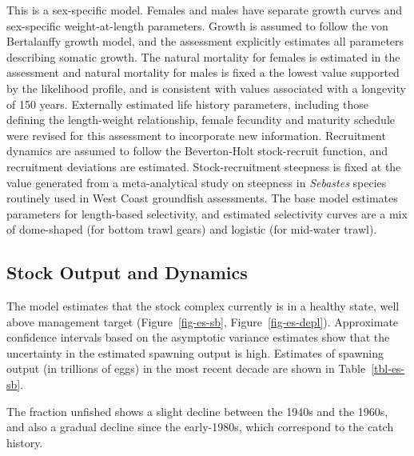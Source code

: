 \documentclass[
]{article}
\begin{document}
This is a sex-specific model. Females and males have separate growth
curves and sex-specific weight-at-length parameters. Growth is assumed
to follow the von Bertalanffy growth model, and the assessment
explicitly estimates all parameters describing somatic growth. The
natural mortality for females is estimated in the assessment and natural
mortality for males is fixed a the lowest value supported by the
likelihood profile, and is consistent with values associated with a
longevity of 150 years. Externally estimated life history parameters,
including those defining the length-weight relationship, female
fecundity and maturity schedule were revised for this assessment to
incorporate new information. Recruitment dynamics are assumed to follow
the Beverton-Holt stock-recruit function, and recruitment deviations are
estimated. Stock-recruitment steepness is fixed at the value generated
from a meta-analytical study on steepness in \emph{Sebastes} species
routinely used in West Coast groundfish assessments. The base model
estimates parameters for length-based selectivity, and estimated
selectivity curves are a mix of dome-shaped (for bottom trawl gears) and
logistic (for mid-water trawl).

\subsection*{Stock Output and Dynamics}\label{stock-output-and-dynamics}

The model estimates that the stock complex currently is in a healthy
state, well above management target (Figure~\ref{fig-es-sb},
Figure~\ref{fig-es-depl}). Approximate confidence intervals based on the
asymptotic variance estimates show that the uncertainty in the estimated
spawning output is high. Estimates of spawning output (in trillions of
eggs) in the most recent decade are shown in Table~\ref{tbl-es-sb}.

The fraction unfished shows a slight decline between the 1940s and the
1960s, and also a gradual decline since the early-1980s, which
correspond to the catch history.

\newpage

\begingroup
\fontsize{9.0pt}{11.0pt}\selectfont
\end{document}
